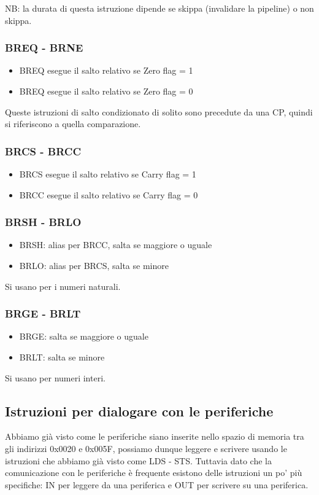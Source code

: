 NB: la durata di questa istruzione dipende se skippa (invalidare la pipeline) o non skippa.

\subsubsection{BREQ - BRNE}
\begin{itemize}
    \item BREQ esegue il salto relativo se Zero flag = 1
    \item BREQ esegue il salto relativo se Zero flag = 0
\end{itemize}

Queste istruzioni di salto condizionato di solito sono precedute da una CP, quindi si riferiscono a quella comparazione.

\subsubsection{BRCS - BRCC}
\begin{itemize}
    \item BRCS esegue il salto relativo se Carry flag = 1
    \item BRCC esegue il salto relativo se Carry flag = 0
\end{itemize}

\subsubsection{BRSH - BRLO}
\begin{itemize}
    \item BRSH: alias per BRCC, salta se maggiore o uguale
    \item BRLO: alias per BRCS, salta se minore
\end{itemize}
Si usano per i numeri naturali.

\subsubsection{BRGE - BRLT}
\begin{itemize}
    \item BRGE: salta se maggiore o uguale
    \item BRLT: salta se minore
\end{itemize}
Si usano per numeri interi.


\subsection{Istruzioni per dialogare con le periferiche}
Abbiamo già visto come le periferiche siano inserite nello spazio di memoria tra gli indirizzi 0x0020 e 0x005F, possiamo dunque leggere e scrivere usando le istruzioni che abbiamo già visto come LDS - STS.
Tuttavia dato che la comunicazione con le periferiche è frequente esistono delle istruzioni un po' più specifiche: IN per leggere da una periferica e OUT per scrivere su una periferica.

